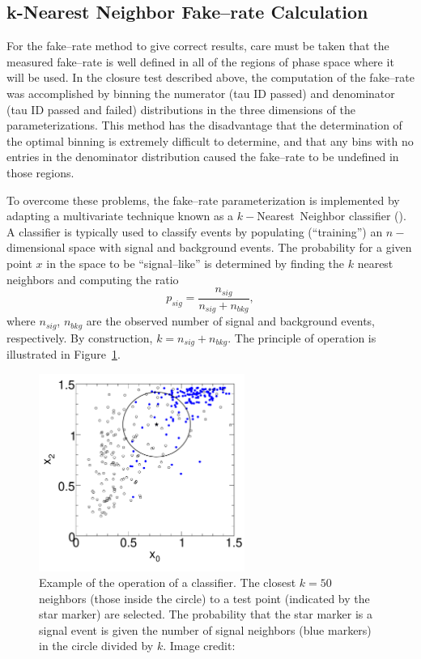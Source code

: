 \subsection{k-Nearest Neighbor Fake--rate Calculation}
\label{sec:KNN}
For the fake--rate method to give correct results, care must be taken that the
measured fake--rate is well defined in all of the regions of phase space where
it will be used.  In the closure test described above, the computation of the
fake--rate was accomplished by binning the numerator (tau ID passed) and
denominator (tau ID passed and failed) distributions in the three dimensions of
the parameterizations. This method has the disadvantage that the determination
of the optimal binning is extremely difficult to determine, and that any
bins with no entries in the denominator distribution caused the fake--rate to be
undefined in those regions.

To overcome these problems, the fake--rate parameterization is implemented by
adapting a multivariate technique known as a $k-$Nearest~Neighbor classifier
(\kNN).  A \kNN classifier is typically used to classify events by
populating (``training'') an $n-$dimensional space with signal and background
events.  The probability for a given point $x$ in the space to be
``signal--like'' is determined by finding the $k$ nearest neighbors and
computing the ratio
\begin{equation}
  p_{sig} = \frac{n_{sig}}{n_{sig} + n_{bkg}},
  \label{eq:KNNEquation}
\end{equation}
where $n_{sig}$, $n_{bkg}$ are the observed number of signal and background
events, respectively. By construction, $k = n_{sig} + n_{bkg}$.  The principle
of operation is illustrated in Figure~\ref{fig:KNN}.
\begin{figure}
  \centering
  \includegraphics[width=0.6\textwidth]{backgrounds_chapter/figures/knn_3d_s13_b7_x02.pdf}
  \caption[$k-$Nearest Neighbor classifier example]{Example of the operation of
  a \kNN classifier.  The closest \mbox{$k=50$} neighbors (those inside the circle) to a
  test point (indicated by the star marker) are selected. The probability that
  the star marker is a signal event is given the number of signal neighbors (blue
  markers) in the circle divided by $k$. Image credit:~\cite{TMVA}}
  \label{fig:KNN}
\end{figure}

